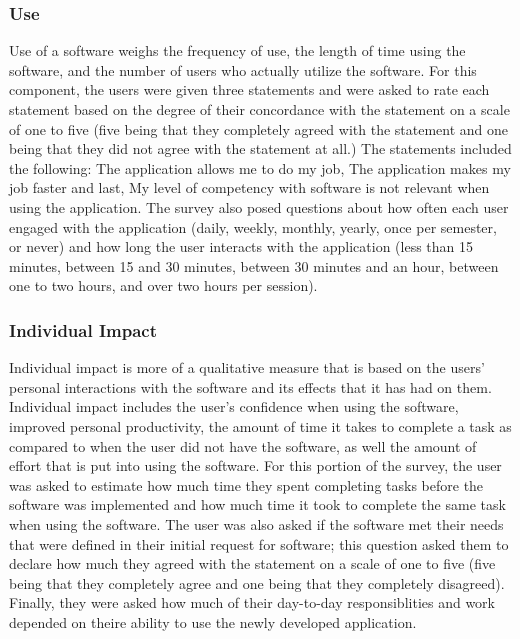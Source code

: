\subsubsection{Use}
Use of a software weighs the frequency of use, the length of time using the software, and the number of users who actually utilize the software. For this component, the users were given three statements and were asked to rate each statement based on the degree of  their concordance with the statement on a scale of one to five (five being that they completely agreed with the statement and one being that they did not agree with the statement at all.) The statements included the following: The application allows me to do my job, The application makes my job faster and last, My level of competency with software is not relevant when using the application. The survey also posed questions about how often each user engaged with the application (daily, weekly, monthly, yearly, once per semester, or never)  and how long the user interacts with the application (less than 15 minutes, between 15 and 30 minutes, between 30 minutes and an hour, between one to two hours, and over two hours per session).

\paragraph{}

\subsubsection{Individual Impact}
Individual impact is more of a qualitative measure that is based on the users' personal interactions with the software and its effects that it has had on them. Individual impact includes the user's confidence when using the software, improved personal productivity, the amount of time it takes to complete a task as compared to when the user did not have the software, as well the amount of effort that is put into using the software. For this portion of the survey, the user was asked to estimate how much time they spent completing tasks before the software was implemented and how much time it took to complete the same task when using the software. The user was also asked if the software met their needs that were defined in their initial request for software; this question asked them to declare how much they agreed with the statement on a scale of one to five (five being that they completely agree and one being that they  completely disagreed). Finally, they were asked how much of their day-to-day responsiblities and work depended on theire ability to use the newly developed application.

